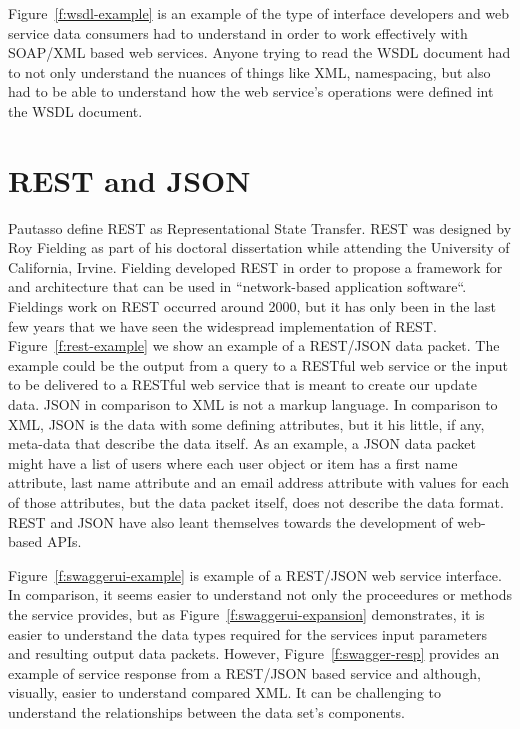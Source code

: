 Figure~\ref{f:wsdl-example}\cite{mycodde2016} is an example of the type of
interface developers and web service data consumers had to understand in order
to work effectively with SOAP/XML based web services.  Anyone trying to read
the WSDL document had to not only understand the nuances of things like XML,
namespacing, but also had to be able to understand how the web service's
operations were defined int the WSDL document.

\section{REST and JSON}
Pautasso\cite{Pautasso2008} define REST as Representational State
Transfer.  REST was designed by Roy Fielding as part of his doctoral
dissertation while attending the University of California, Irvine\cite{Fielding2000}.
Fielding developed REST in order to propose a framework for and architecture
that can be used in ``network-based application software``\cite{Fielding2000}.
Fieldings work on REST occurred around 2000, but it has only been in the last
few years that we have seen the widespread implementation of REST.
Figure~\ref{f:rest-example} we show an example of a REST/JSON data packet.  The
example could be the output from a query to a RESTful web service or the input
to be delivered to a RESTful web service that is meant to create our update data.
JSON in comparison to XML is not a markup language.  In comparison to XML, JSON
is the data with some defining attributes, but it his little, if any, meta-data
that describe the data itself.  As an example, a JSON data packet might have a
list of users where each user object or item has a first name attribute, last
name attribute and an email address attribute with values for each of those
attributes, but the data packet itself, does not describe the data format.  REST
and JSON have also leant themselves towards the development of web-based APIs.

Figure~\ref{f:swaggerui-example}\cite{swaggerio2018} is example of a REST/JSON web service
interface.  In comparison, it seems easier to understand not only the proceedures
or methods the service provides, but as Figure~\ref{f:swaggerui-expansion}\cite{swaggerio2018}
demonstrates, it is easier to understand the data types required for the services input
parameters and resulting output data packets.  However, Figure~\ref{f:swagger-resp}\cite{swaggerresp2018}
provides an example of service  response from a REST/JSON based service and
although, visually, easier to understand compared XML.  It can be challenging 
to understand the relationships between the data set's components.  

